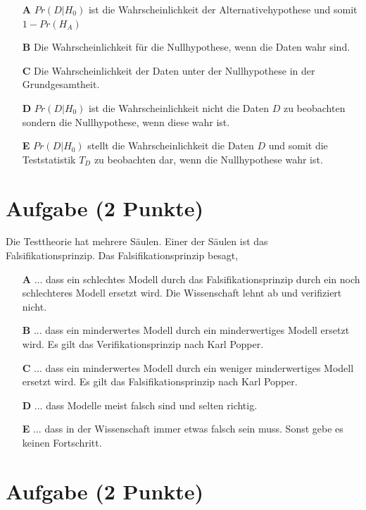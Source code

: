 \documentclass[a4paper, 9pt]{scrartcl}\usepackage[]{graphicx}\usepackage[]{xcolor}
\begin{document}
\begin{enumerate}
\item [\textbf{A} \msquare] $Pr(D|H_0)$ ist die Wahrscheinlichkeit der Alternativehypothese und somit $1 - Pr(H_A)$
\item [\textbf{B} \msquare] Die Wahrscheinlichkeit für die Nullhypothese, wenn die Daten wahr sind.
\item [\textbf{C} \msquare] Die Wahrscheinlichkeit der Daten unter der Nullhypothese in der Grundgesamtheit.
\item [\textbf{D} \msquare] $Pr(D|H_0)$ ist die Wahrscheinlichkeit nicht die Daten $D$ zu beobachten sondern die Nullhypothese, wenn diese wahr ist.
\item [\textbf{E} \msquare] $Pr(D|H_0)$ stellt die Wahrscheinlichkeit die Daten $D$ und somit die Teststatistik $T_D$ zu beobachten dar, wenn die Nullhypothese wahr ist.
\end{enumerate}

\section{Aufgabe \hfill (2 Punkte)}



Die Testtheorie hat mehrere Säulen. Einer der Säulen ist das Falsifikationsprinzip. Das Falsifikationsprinzip besagt,



\begin{enumerate}
\item [\textbf{A} \msquare] ... dass ein schlechtes Modell durch das Falsifikationsprinzip durch ein noch schlechteres Modell ersetzt wird. Die Wissenschaft lehnt ab und verifiziert nicht.
\item [\textbf{B} \msquare] ... dass ein minderwertes Modell durch ein minderwertiges Modell ersetzt wird. Es gilt das Verifikationsprinzip nach Karl Popper.
\item [\textbf{C} \msquare] ... dass ein minderwertes Modell durch ein weniger minderwertiges Modell ersetzt wird. Es gilt das Falsifikationsprinzip nach Karl Popper.
\item [\textbf{D} \msquare] ... dass Modelle meist falsch sind und selten richtig.
\item [\textbf{E} \msquare] ... dass in der Wissenschaft immer etwas falsch sein muss. Sonst gebe es keinen Fortschritt.
\end{enumerate}

\section{Aufgabe \hfill (2 Punkte)}
\end{document}
